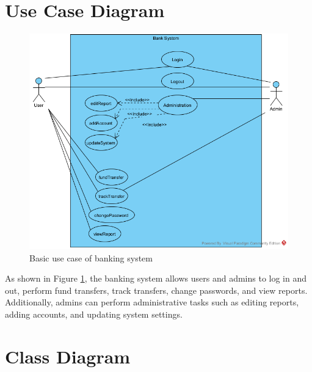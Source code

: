 \documentclass[12pt]{article}
\begin{document}
\newpage 
\section{Use Case Diagram}
\begin{figure}[h]
    \centering
    \includegraphics[width=\linewidth]{WeeklyReport/BankSysUseCase.png}
    \caption{Basic use case of banking system }
    \label{fig:usecase}
\end{figure}

As shown in Figure \ref{fig:usecase}, the banking system allows users and admins to log in and out, perform fund transfers, track transfers, change passwords, and view reports. Additionally, admins can perform administrative tasks such as editing reports, adding accounts, and updating system settings.

\newpage
\section{Class Diagram}
\end{document}
